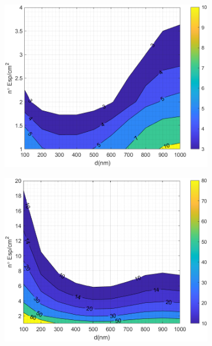 \begin{figure}[H]
	\centering
	\begin{subfigure}[b]{0.49\textwidth}
		\centering
			\includegraphics[width=1.00\textwidth]{figuras/Resultados/RelacionCondRad/SS.png}
		\caption{ }
		\label{fig:rel_SsSiO2Ge}
	\end{subfigure}
	\hfill
	\begin{subfigure}[b]{0.49\textwidth}
		\centering
			\includegraphics[width=1.00\textwidth]{figuras/Resultados/RelacionCondRad/SS_Rc_empirico.png}
		\caption{ }
		\label{fig:rel_SsSiO2Ge_Rc_emp}
	\end{subfigure}

\end{figure}
